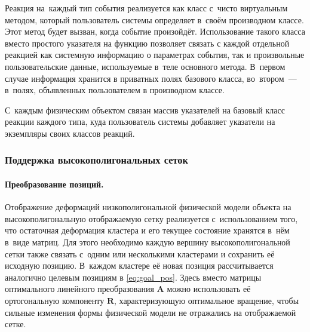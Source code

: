 \documentclass[a4paper, 14pt, titlepage]{extarticle}
\newcommand{\matx}[1]{\mathbf{#1}} %
\begin{document}
        Реакция на~каждый тип события реализуется как класс с~чисто виртуальным методом, который
        пользователь системы определяет в~своём производном классе. Этот метод будет вызван, когда
        событие произойдёт. Использование такого класса вместо простого указателя на функцию
        позволяет связать с каждой отдельной реакцией как системную информацию о параметрах события,
        так и произвольные пользовательские данные, используемые в~теле основного метода. В~первом
        случае информация хранится в приватных полях базового класса, во~втором~--- в~полях,
        объявленных пользователем в производном классе.

        С~каждым физическим объектом связан массив указателей на базовый класс реакции каждого типа,
        куда пользователь системы добавляет указатели на экземпляры своих классов реакций.

      \subsubsection{Поддержка высокополигональных сеток}

        \paragraph{Преобразование позиций.}
        Отображение деформаций низкополигональной физической модели объекта на высокополигональную
        отображаемую сетку реализуется с~использованием того, что остаточная деформация кластера и
        его текущее состояние хранятся в~нём в~виде матриц.  Для этого необходимо каждую вершину
        высокополигональной сетки также связать с~одним или несколькими кластерами и сохранить её
        исходную позицию. В~каждом кластере её новая позиция рассчитывается аналогично целевым
        позициям в \eqref{eq:goal_pos}. Здесь вместо матрицы оптимального линейного преобразования
        $\matx A$ можно использовать её ортогональную компоненту $\matx R$, характеризующую
        оптимальное вращение, чтобы сильные изменения формы физической модели не отражались на
        отображаемой сетке.
\end{document}
